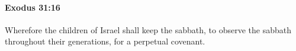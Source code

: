 
		\paragraph{Exodus 31:16} %
			\label{EXODUS-31-16}

			Wherefore the children of Israel shall keep the sabbath, to observe the sabbath throughout their generations, for a perpetual covenant.


